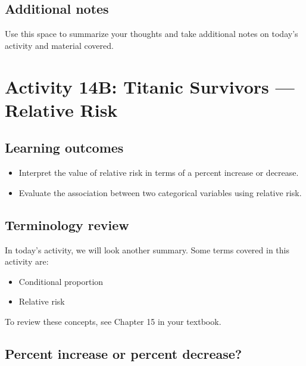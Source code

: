 \documentclass[
]{report}
\begin{document}
\hypertarget{additional-notes-21}{%
\subsection{Additional notes}\label{additional-notes-21}}

Use this space to summarize your thoughts and take additional notes on today's activity and material covered.

\newpage

\hypertarget{activity-14b-titanic-survivors-relative-risk}{%
\section{Activity 14B: Titanic Survivors --- Relative Risk}\label{activity-14b-titanic-survivors-relative-risk}}


\hypertarget{learning-outcomes-29}{%
\subsection{Learning outcomes}\label{learning-outcomes-29}}

\begin{itemize}
\item
  Interpret the value of relative risk in terms of a percent increase or decrease.
\item
  Evaluate the association between two categorical variables using relative risk.
\end{itemize}

\hypertarget{terminology-review-24}{%
\subsection{Terminology review}\label{terminology-review-24}}

In today's activity, we will look another summary. Some terms covered in this activity are:

\begin{itemize}
\item
  Conditional proportion
\item
  Relative risk
\end{itemize}

To review these concepts, see Chapter 15 in your textbook.

\hypertarget{percent-increase-or-percent-decrease}{%
\subsection{Percent increase or percent decrease?}\label{percent-increase-or-percent-decrease}}
\end{document}
